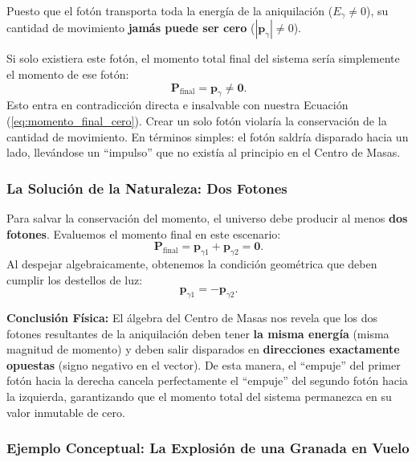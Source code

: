 \documentclass[11pt,a4paper]{book}
\begin{document}
Puesto que el fotón transporta toda la energía de la aniquilación ($E_\gamma \neq 0$), su cantidad de movimiento \textbf{jamás puede ser cero} ($|\boldsymbol{p}_\gamma| \neq 0$). 

Si solo existiera este fotón, el momento total final del sistema sería simplemente el momento de ese fotón:
\begin{equation}
    \boldsymbol{P}_{\text{final}} = \boldsymbol{p}_\gamma \neq \boldsymbol{0}.
\end{equation}
Esto entra en contradicción directa e insalvable con nuestra Ecuación (\ref{eq:momento_final_cero}). Crear un solo fotón violaría la conservación de la cantidad de movimiento. En términos simples: el fotón saldría disparado hacia un lado, llevándose un ``impulso'' que no existía al principio en el Centro de Masas.

\subsubsection{La Solución de la Naturaleza: Dos Fotones}

Para salvar la conservación del momento, el universo debe producir al menos \textbf{dos fotones}. Evaluemos el momento final en este escenario:
\begin{equation}
    \boldsymbol{P}_{\text{final}} = \boldsymbol{p}_{\gamma 1} + \boldsymbol{p}_{\gamma 2} = \boldsymbol{0}.
\end{equation}
Al despejar algebraicamente, obtenemos la condición geométrica que deben cumplir los destellos de luz:
\begin{equation}
    \boldsymbol{p}_{\gamma 1} = -\boldsymbol{p}_{\gamma 2}.
\end{equation}

\textbf{Conclusión Física:}
El álgebra del Centro de Masas nos revela que los dos fotones resultantes de la aniquilación deben tener \textbf{la misma energía} (misma magnitud de momento) y deben salir disparados en \textbf{direcciones exactamente opuestas} (signo negativo en el vector). De esta manera, el ``empuje'' del primer fotón hacia la derecha cancela perfectamente el ``empuje'' del segundo fotón hacia la izquierda, garantizando que el momento total del sistema permanezca en su valor inmutable de cero.





\subsubsection{Ejemplo Conceptual: La Explosión de una Granada en Vuelo}
\end{document}
